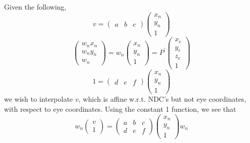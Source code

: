 \documentclass[11pt]{tingpset}
\begin{document}
  Given the following,
  \[
    v =
    \begin{pmatrix}
      a & b & c
    \end{pmatrix}
    \begin{pmatrix}
      x_n \\
      y_n \\
      1
    \end{pmatrix}
  \]
  \[
    \begin{pmatrix}
      w_n x_n \\
      w_n y_n \\
      w_n
    \end{pmatrix}
    =
    w_n
    \begin{pmatrix}
      x_n \\
      y_n \\
      1
    \end{pmatrix}
    =
    P^\prime
    \begin{pmatrix}
      x_e \\
      y_e \\
      z_e \\
      1
    \end{pmatrix}
  \]
  \[
    1 =
    \begin{pmatrix}
      d & e & f
    \end{pmatrix}
    \begin{pmatrix}
      x_n \\
      y_n \\
      1
    \end{pmatrix}
  \]
  we wish to interpolate $v$, which is affine w.r.t. NDC's but not eye coordinates, with respect to eye coordinates. Using the constant 1 function, we see that
  \[
    w_n
    \begin{pmatrix}
      v \\
      1
    \end{pmatrix}
    =
    \begin{pmatrix}
      a & b & c \\
      d & e & f
    \end{pmatrix}
    \begin{pmatrix}
      x_n \\
      y_n \\
      1
    \end{pmatrix}
    w_n
  \]
\end{document}
